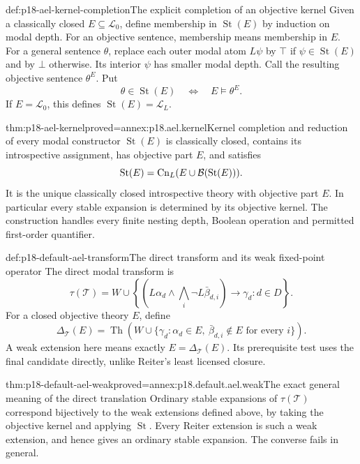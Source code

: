 \begin{hbdefinition}{def:p18-ael-kernel-completion}{The explicit completion of an objective kernel}
Given a classically closed \(E\subseteq\mathcal L_0\),
define membership in \(\operatorname{St}(E)\)
by induction on modal depth.
For an objective sentence, membership means
membership in \(E\). For a general
sentence \(\theta\), replace each outer
modal atom \(L\psi\) by \(\top\) if
\(\psi\in\operatorname{St}(E)\) and
by \(\bot\) otherwise. Its interior
\(\psi\) has smaller modal depth.
Call the resulting objective sentence
\(\theta^E\). Put
\[
                    \theta\in\operatorname{St}(E)
                                \quad\Longleftrightarrow\quad E\models\theta^E.
\]
If \(E=\mathcal L_0\), this defines
\(\operatorname{St}(E)=\mathcal L_L\).
\end{hbdefinition}

\begin{hbtheorem}{thm:p18-ael-kernel}{proved=annex:p18.ael.kernel}{Kernel completion and reduction of every modal constructor}
\(\operatorname{St}(E)\) is classically
closed, contains its introspective
assignment, has objective part \(E\),
and satisfies
\[
 \operatorname{St}(E)=
                   \operatorname{Cn}_L(E\cup{\cal B}(\operatorname{St}(E))).
\]
It is the unique classically closed
introspective theory with objective
part \(E\). In particular every
stable expansion is determined by
its objective kernel. The construction
handles every finite nesting depth,
Boolean operation and permitted
first-order quantifier.
\end{hbtheorem}

\begin{hbdefinition}{def:p18-default-ael-transform}{The direct transform and its weak fixed-point operator}
The direct modal transform is
\[
 \tau(\mathcal T)=W\cup
 \left\{\left(L\alpha_d\land\bigwedge_i\neg L\bar\beta_{d,i}\right)
                                              \to\gamma_d:d\in D\right\}.
\]
For a closed objective theory \(E\), define
\[
 \Delta_{\mathcal T}(E)=
 \operatorname{Th}\!\left(W\cup
 \{\gamma_d:\alpha_d\in E,\ \bar\beta_{d,i}\notin E\text{ for every }i\}\right).
\]
A weak extension here means exactly
\(E=\Delta_{\mathcal T}(E)\).
Its prerequisite test uses the final
candidate directly, unlike Reiter's
least licensed closure.
\end{hbdefinition}

\begin{hbtheorem}{thm:p18-default-ael-weak}{proved=annex:p18.default.ael.weak}{The exact general meaning of the direct translation}
Ordinary stable expansions of \(\tau(\mathcal T)\)
correspond bijectively to the weak extensions
defined above, by taking the objective
kernel and applying \(\operatorname{St}\).
Every Reiter extension is such a weak
extension, and hence gives an ordinary
stable expansion. The converse fails
in general.
\end{hbtheorem}


